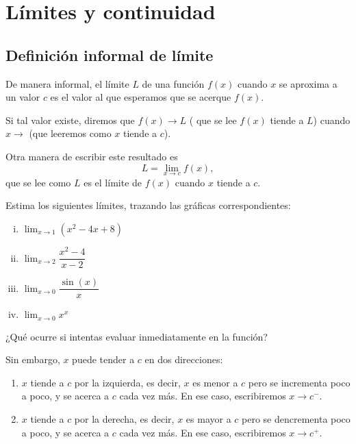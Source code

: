 \section{Límites y continuidad}

\subsection{Definición informal de límite}

De manera informal, el límite $ L $ de una función $ f(x) $ cuando $ x $ se aproxima a un valor $ c $ es el valor al que esperamos que se acerque $ f(x) $.

Si tal valor existe, diremos que $ f(x)\to L $ ( que se lee  $f(x)  $ tiende a $ L $) cuando $ x \to  $ (que leeremos como $ x $ tiende a $ c $).

Otra manera de escribir este resultado es
\[ L = \lim_{x\to c} f(x) ,\]
que se lee como $ L $ es el límite de $ f(x) $ cuando $ x $ tiende a $ c $.


\begin{resuelto}
	Estima los siguientes límites, trazando las gráficas correspondientes:
	\begin{enumerate}[(i)]
		\item $\lim_{x\to 1}\left( x^{2}-4x+8 \right)$
		\item $\lim_{x\to 2}\dfrac{x^{2}-4}{x-2}$
		\item $\lim_{x\to 0}\dfrac{\sin(x)}{x}$
		\item $ \lim_{x \to 0} x^{x} $
	\end{enumerate}
	¿Qué ocurre si intentas evaluar inmediatamente en la función?
\end{resuelto}

Sin embargo, $ x $ puede tender a $ c $ en dos direcciones:
\begin{enumerate}
	\item $ x $ tiende a $ c $ por la izquierda, es decir, $ x $ es menor a $ c $ pero se incrementa poco a poco, y se acerca a $ c $ cada vez más. En ese caso, escribiremos $ x\to c^{-} .$
	\item $ x $ tiende a $ c $ por la derecha, es decir, $ x $ es mayor a $ c $ pero se dencrementa poco a poco, y se acerca a $ c $ cada vez más. En ese caso, escribiremos $ x\to c^{+} .$
\end{enumerate}

